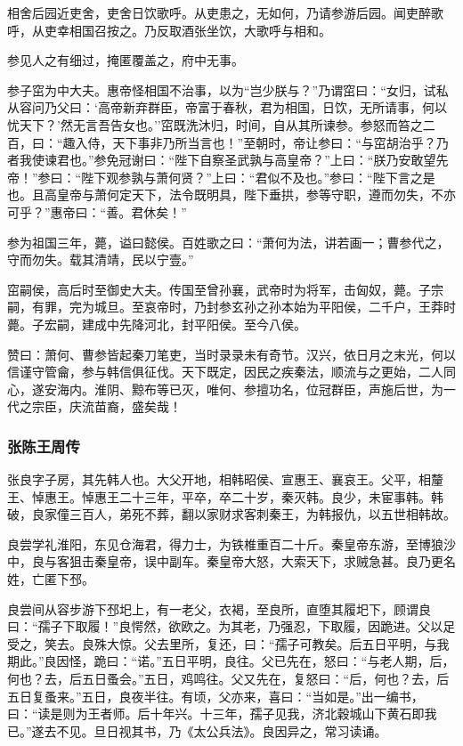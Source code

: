 \documentclass[]{article}
\begin{document}
相舍后园近吏舍，吏舍日饮歌呼。从吏患之，无如何，乃请参游后园。闻吏醉歌呼，从吏幸相国召按之。乃反取酒张坐饮，大歌呼与相和。

参见人之有细过，掩匿覆盖之，府中无事。

参子窋为中大夫。惠帝怪相国不治事，以为``岂少朕与？''乃谓窋曰：``女归，试私从容问乃父曰：`高帝新弃群臣，帝富于春秋，君为相国，日饮，无所请事，何以忧天下？'然无言吾告女也。''窋既洗沐归，时间，自从其所谏参。参怒而笞之二百，曰：``趣入侍，天下事非乃所当言也！''至朝时，帝让参曰：``与窋胡治乎？乃者我使谏君也。''参免冠谢曰：``陛下自察圣武孰与高皇帝？''上曰：``朕乃安敢望先帝！''参曰：``陛下观参孰与萧何贤？''上曰：``君似不及也。''参曰：``陛下言之是也。且高皇帝与萧何定天下，法令既明具，陛下垂拱，参等守职，遵而勿失，不亦可乎？''惠帝曰：``善。君休矣！''

参为祖国三年，薨，谥曰懿侯。百姓歌之曰：``萧何为法，讲若画一；曹参代之，守而勿失。载其清靖，民以宁壹。''

窋嗣侯，高后时至御史大夫。传国至曾孙襄，武帝时为将军，击匈奴，薨。子宗嗣，有罪，完为城旦。至哀帝时，乃封参玄孙之孙本始为平阳侯，二千户，王莽时薨。子宏嗣，建成中先降河北，封平阳侯。至今八侯。

赞曰：萧何、曹参皆起秦刀笔吏，当时录录未有奇节。汉兴，依日月之末光，何以信谨守管龠，参与韩信俱征伐。天下既定，因民之疾秦法，顺流与之更始，二人同心，遂安海内。淮阴、黥布等已灭，唯何、参擅功名，位冠群臣，声施后世，为一代之宗臣，庆流苗裔，盛矣哉！

\hypertarget{header-n3764}{%
\subsubsection{张陈王周传}\label{header-n3764}}

张良字子房，其先韩人也。大父开地，相韩昭侯、宣惠王、襄哀王。父平，相釐王、悼惠王。悼惠王二十三年，平卒，卒二十岁，秦灭韩。良少，未宦事韩。韩破，良家僮三百人，弟死不葬，翻以家财求客刺秦王，为韩报仇，以五世相韩故。

良尝学礼淮阳，东见仓海君，得力士，为铁椎重百二十斤。秦皇帝东游，至博狼沙中，良与客狙击秦皇帝，误中副车。秦皇帝大怒，大索天下，求贼急甚。良乃更名姓，亡匿下邳。

良尝间从容步游下邳圯上，有一老父，衣褐，至良所，直堕其履圯下，顾谓良曰：``孺子下取履！''良愕然，欲欧之。为其老，乃强忍，下取履，因跪进。父以足受之，笑去。良殊大惊。父去里所，复还，曰：``孺子可教矣。后五日平明，与我期此。''良因怪，跪曰：``诺。''五日平明，良往。父已先在，怒曰：``与老人期，后，何也？去，后五日蚤会。''五日，鸡鸣往。父又先在，复怒曰：``后，何也？去，后五日复蚤来。''五日，良夜半往。有顷，父亦来，喜曰：``当如是。''出一编书，曰：``读是则为王者师。后十年兴。十三年，孺子见我，济北穀城山下黄石即我已。''遂去不见。旦日视其书，乃《太公兵法》。良因异之，常习读诵。
\end{document}
